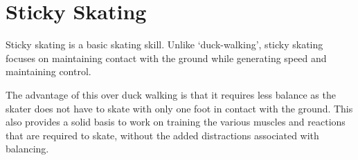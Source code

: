 \chapter{Sticky Skating}
\label{ch:sticky}


Sticky skating is a basic skating skill.
Unlike `duck-walking', sticky skating focuses on maintaining contact with the ground while generating speed and maintaining control.  


The advantage of this over duck walking is that it requires less balance as the skater does not have to skate with only one foot in contact with the ground.    
This also provides a solid basis to work on training the various muscles and reactions that are required to skate, without the added distractions associated with balancing.  
